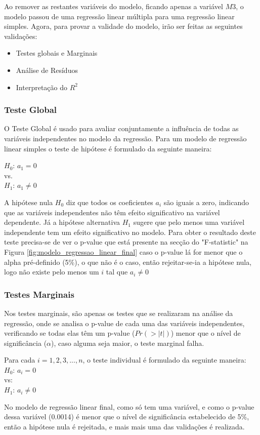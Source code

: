 \documentclass[%
 aip,
cp,  %
 amsmath,amssymb,%
 reprint,%
]{revtex4-2}
\begin{document}
Ao remover as restantes variáveis do modelo, ficando apenas a variável $M3$, o modelo passou de uma regressão linear múltipla para uma regressão linear simples. Agora, para provar a validade do modelo, irão ser feitas as seguintes validações:
\begin{itemize}
    \item Testes globais e Marginais
    \item Análise de Resíduos
    \item Interpretação do $R^2$ %
\end{itemize}


\hfill \break

\subsubsection{Teste Global}
O Teste Global é usado para avaliar conjuntamente a influência de todas as variáveis independentes no modelo da regressão. Para um modelo de regressão linear simples o teste de hipótese é formulado da seguinte maneira:
\hfill \break
\begin{center}
    \(H_0: \, a_1 = 0\) \\
    vs.\\
    \(H_1: \, a_1 \neq 0\)
\end{center}
A hipótese nula \(H_0\) diz que todos os coeficientes \(a_i\) são iguais a zero, indicando que as variáveis independentes não têm efeito significativo na variável dependente. Já a hipótese alternativa \(H_1\) sugere que pelo menos uma variável independente tem um efeito significativo no modelo. Para obter o resultado deste teste precisa-se de ver o p-value que está presente na secção do "F-statistic" na Figura \ref{fig:modelo_regressao_linear_final} caso o p-value lá for menor que o alpha pré-definido (5\%), o que não é o caso, então rejeitar-se-ia a hipótese nula, logo não existe pelo menos um $i$ tal que $a_{i}\ne0$

\subsubsection{Testes Marginais}
 Nos testes marginais, são apenas os testes que se realizaram na análise da regressão, onde se analisa o p-value de cada uma das variáveis independentes, verificando se todas elas têm um p-value ($Pr(>|t|)$) menor que o nível de significância ($\alpha$), caso alguma seja maior, o teste marginal falha. \\
\hfill \break
\begin{center}
    Para cada \(i = 1, 2, 3, ..., n\), o teste individual é formulado da seguinte maneira:
    \newline
    \(H_0: \, a_i = 0\) \\
    vs:\\
    \(H_1: \, a_i \neq 0\)
\end{center}
No modelo de regressão linear final, como só tem uma variável, e como o p-value dessa variável (0.0014) é menor que o nível de significância estabelecido de 5\%, então a hipótese nula é rejeitada, e mais mais uma das validações é realizada.
\end{document}

